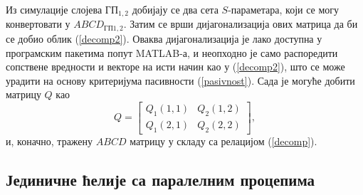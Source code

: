\documentclass[main.tex]{subfiles}
\begin{document}
Из симулације слојева $ГП_{1,2}$ добијају се два сета $S$-параметара, који се могу конвертовати у $ABCD_{ГП1,2}$. Затим се врши дијагонализација ових матрица да би се добио облик (\ref{decomp2}). Оваква дијагонализација је лако доступна у програмским пакетима попут MATLAB-а, и неопходно је само распоредити сопствене вредности и векторе на исти начин као у (\ref{decomp2}), што се може урадити на основу критеријума пасивности (\ref{pasivnost}). Сада је могуће добити матрицу $Q$ као
\begin{equation}
Q =
\begin{bmatrix}
Q_1(1,1) & Q_2(1,2) \\
Q_1(2,1) & Q_2(2,2)
\end{bmatrix},
\end{equation}
и, коначно, тражену $ABCD$ матрицу у складу са релацијом (\ref{decomp}).

\subsection{Јединичне ћелије са паралелним процепима}
\end{document}
